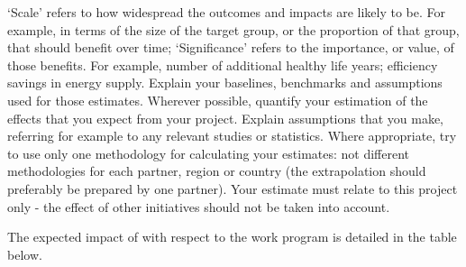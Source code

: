 {	‘Scale’ refers to how widespread the outcomes and impacts are likely to be. For example, in terms of the size of the target group, or the proportion of that group, that should benefit over time; ‘Significance’ refers to the importance, or value, of those benefits. For example, number of additional healthy life years; efficiency savings in energy supply.
	Explain your baselines, benchmarks and assumptions used for those estimates. Wherever possible, quantify your estimation of the effects that you expect from your project. Explain assumptions that you make, referring for example to any relevant studies or statistics. Where appropriate, try to use only one methodology for calculating your estimates: not different methodologies for each partner, region or country (the extrapolation should preferably be prepared by one partner).
	Your estimate must relate to this project only - the effect of other initiatives should not be taken into account.
}


The expected impact of \TheProject with respect to the
work program is detailed in the table below.

